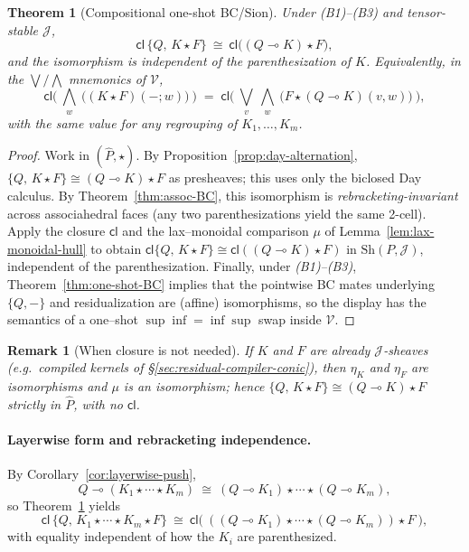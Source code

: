 \documentclass[11pt]{article}
\numberwithin{equation}{section}
\theoremstyle{upright}
\newtheorem{theorem}{Theorem}
\newtheorem{remark}{Remark}
\newcommand{\V}{\mathcal{V}}
\newcommand{\Sh}{\mathrm{Sh}}
\begin{document}
\begin{theorem}[Compositional one-shot BC/Sion]\label{thm:comp-sion}
Under \emph{(B1)--(B3)} and tensor-stable $\mathcal J$,
\[
\boxed{\quad
\mathsf{cl}\,\{Q,\,K\star F\}
\ \cong\
\mathsf{cl}\bigl((Q\multimap K)\star F\bigr),
\quad}
\]
and the isomorphism is \emph{independent of the parenthesization} of $K$.
Equivalently, in the $\bigvee/\bigwedge$ mnemonics of $\V$,
\[
\mathsf{cl}\!\Big(\ \bigwedge_{w}\ \big( (K\star F)(-;w)\big)\ \Big)
\;=\;
\mathsf{cl}\!\Big(\ \bigvee_{v}\ \bigwedge_{w}\ \big( F\star (Q\multimap K)(v,w)\big)\ \Big),
\]
with the same value for any regrouping of $K_1,\dots,K_m$.
\end{theorem}

\begin{proof}
Work in $(\widehat P,\star)$. By Proposition~\ref{prop:day-alternation},
\(
\{Q,\,K\star F\}\cong (Q\multimap K)\star F
\)
as presheaves; this uses only the biclosed Day calculus. By Theorem~\ref{thm:assoc-BC},
this isomorphism is \emph{rebracketing-invariant} across associahedral faces (any two
parenthesizations yield the same 2-cell). Apply the closure $\mathsf{cl}$ and the
lax–monoidal comparison $\mu$ of Lemma~\ref{lem:lax-monoidal-hull} to obtain
\(
\mathsf{cl}\{Q,\,K\star F\}\cong \mathsf{cl}((Q\multimap K)\star F)
\)
in $\Sh(P,\mathcal J)$, independent of the parenthesization.
Finally, under \emph{(B1)--(B3)}, Theorem~\ref{thm:one-shot-BC} implies that the pointwise
BC mates underlying $\{Q,-\}$ and residualization are (affine) isomorphisms, so the
display has the semantics of a one–shot $\sup\inf=\inf\sup$ swap inside $\V$.\!%
\end{proof}

\begin{remark}[When closure is not needed]
If $K$ and $F$ are already $\mathcal J$-sheaves (e.g.\ compiled kernels of
\S\ref{sec:residual-compiler-conic}), then $\eta_{K}$ and $\eta_F$ are isomorphisms and
$\mu$ is an isomorphism; hence
\(
\{Q,\,K\star F\}\cong (Q\multimap K)\star F
\)
\emph{strictly} in $\widehat P$, with no $\mathsf{cl}$.
\end{remark}

\paragraph{Layerwise form and rebracketing independence.}
By Corollary~\ref{cor:layerwise-push},
\[
Q\multimap (K_1\star\cdots\star K_m)\ \cong\
(Q\multimap K_1)\star\cdots\star(Q\multimap K_m),
\]
so Theorem~\ref{thm:comp-sion} yields
\[
\mathsf{cl}\,\{Q,\,K_1\star\cdots\star K_m\star F\}
\ \cong\
\mathsf{cl}\Big(\ ((Q\multimap K_1)\star\cdots\star(Q\multimap K_m))\star F\ \Big),
\]
with equality independent of how the $K_i$ are parenthesized.
\end{document}
